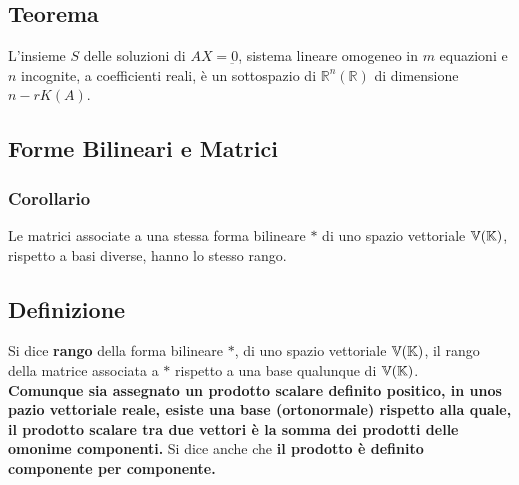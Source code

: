 \documentclass[../main.tex]{subfiles}
\begin{document}
\subsection{Teorema}
L'insieme $S$ delle soluzioni di $AX = \underbar{0}$, sistema lineare omogeneo
in $m$ equazioni e $n$ incognite, a coefficienti reali, è un sottospazio di
$\mathbb{R}^n (\mathbb{R})$ di dimensione $n-rK (A)$.

\subsection{Forme Bilineari e Matrici}

\begin{comment}
Se $\Vx{n}$ è uno spazio vettoriale di dimensione $n$, a ogni forma bilineare è possibile associare una matrice rispetto a una base $B$ scelta in $V$. Precisamente
\subsubsection{Definizione}
Sia $B = (\s{e}{_n})$ una base di $\Vx{n}$ e sia $*$ una forma bilineare su
$\Vx{n}$. La matrice di $*$ rispetto alla base $B$ è la:
\[
    A^*_B = \begin{matrix}
        e_1* e_1 & e_1* e_2 & \cdots & e_1* e_n \\
        e_2* e_1 & e_2* e_2 & \cdots & e_2* e_n \\
        \vdots   & \vdots   & \ddots & \vdots   \\
        e_n* e_1 & e_n* e_2 & \cdots & e_n* e_n \\
    \end{matrix}
\]
Osserviamo anzitutto che, utilizzando la matrice associata a una forma
bilineare, è possibile calcolare rapidamente $\textbf{v}*\textbf{w}$, ove
$\textbf{v}$ e $\textbf{w}$ sono due vettori di $\Vx{n}$, aventi componenti in
$B$, rispettivamente, ${^{t}X} = (\s{x}{n})$ e ${^{t}Y} = (\s{y}{n})$, allora
applicando le proprietà
\end{comment}

\subsubsection{Corollario}
Le matrici associate a una stessa forma bilineare $*$ di uno spazio vettoriale
$\mathbb{V} (\mathbb{K})$, rispetto a basi diverse, hanno lo stesso rango.

\subsection{Definizione}
Si dice \textbf{rango} della forma bilineare $*$, di uno spazio vettoriale
$\mathbb{V} (\mathbb{K})$, il rango della matrice associata a $*$ rispetto a una base qualunque di
$\mathbb{V} (\mathbb{K})$.\\ \textbf{Comunque sia assegnato un prodotto scalare definito positico,
    in unos pazio vettoriale reale, esiste una base (ortonormale) rispetto alla
    quale, il prodotto scalare tra due vettori è la somma dei prodotti delle
    omonime componenti.} Si dice anche che \textbf{il prodotto è definito
    componente per componente.}
\end{document}
